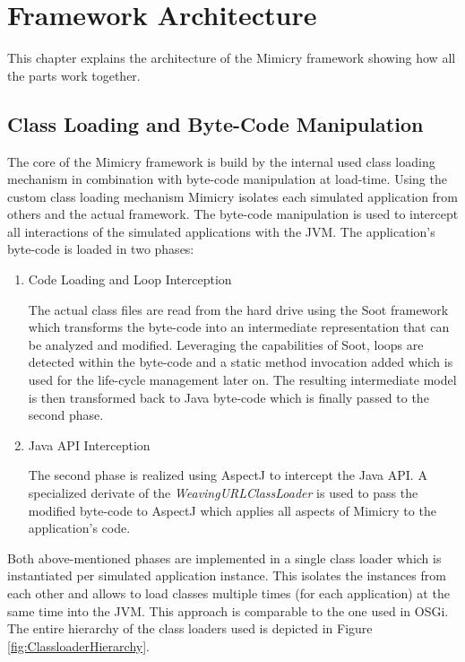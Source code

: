 \documentclass[a4paper,oneside]{book}
\begin{document}
\chapter{Framework Architecture}
This chapter explains the architecture of the Mimicry framework showing how all the parts work together.

\section{Class Loading and Byte-Code Manipulation}
The core of the Mimicry framework is build by the internal used class loading mechanism in combination with byte-code manipulation at load-time. Using the custom class loading mechanism Mimicry isolates each simulated application from others and the actual framework. The byte-code manipulation is used to intercept all interactions of the simulated applications with the JVM. The application's byte-code is loaded in two phases:
\begin{enumerate}
\item Code Loading and Loop Interception

The actual class files are read from the hard drive using the Soot framework which transforms the byte-code into an intermediate representation that can be analyzed and modified. Leveraging the capabilities of Soot, loops are detected within the byte-code and a static method invocation added which is used for the life-cycle management later on. The resulting intermediate model is then transformed back to Java byte-code which is finally passed to the second phase.
\item Java API Interception

The second phase is realized using AspectJ to intercept the Java API. A specialized derivate of the \textit{WeavingURLClassLoader} is used to pass the modified byte-code to AspectJ which applies all aspects of Mimicry to the application's code.
\end{enumerate}
Both above-mentioned phases are implemented in a single class loader which is instantiated per simulated application instance. This isolates the instances from each other and allows to load classes multiple times (for each application) at the same time into the JVM. This approach is comparable to the one used in OSGi. The entire hierarchy of the class loaders used is depicted in Figure \ref{fig:ClassloaderHierarchy}.
\end{document}
